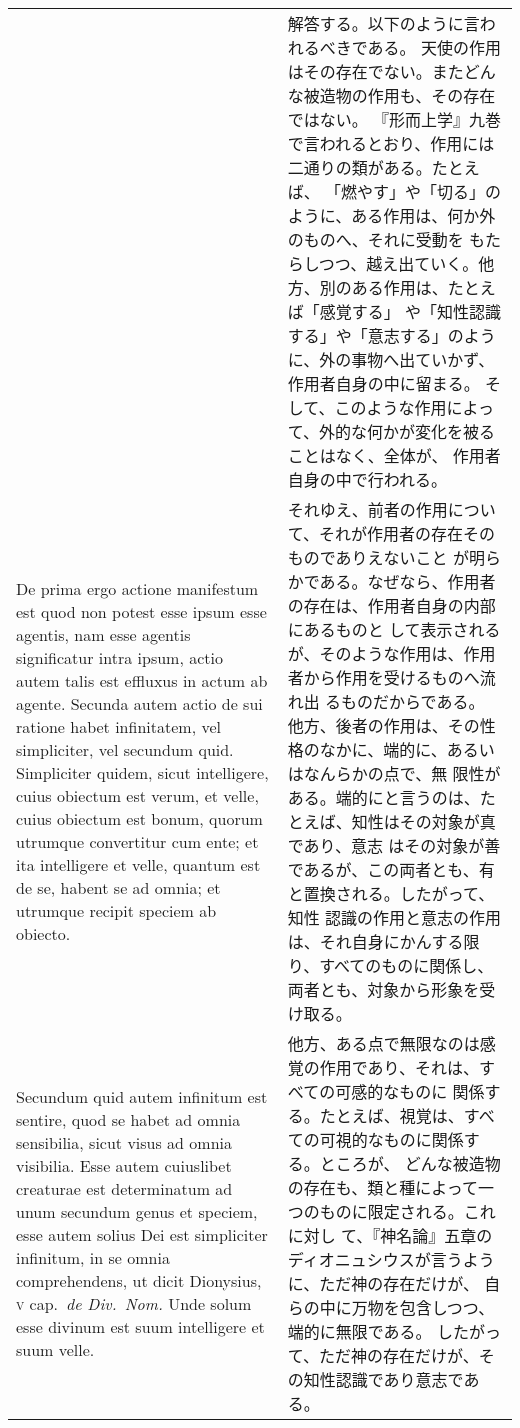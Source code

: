 \documentclass[10pt]{jsarticle} %
\begin{document}
\begin{longtable}{p{21em}p{21em}}
&

解答する。以下のように言われるべきである。
天使の作用はその存在でない。またどんな被造物の作用も、その存在ではない。
『形而上学』九巻で言われるとおり、作用には二通りの類がある。たとえば、
 「燃やす」や「切る」のように、ある作用は、何か外のものへ、それに受動を
 もたらしつつ、越え出ていく。他方、別のある作用は、たとえば「感覚する」
 や「知性認識する」や「意志する」のように、外の事物へ出ていかず、
 作用者自身の中に留まる。
そして、このような作用によって、外的な何かが変化を被ることはなく、全体が、
 作用者自身の中で行われる。


\\

De
prima ergo actione manifestum est quod non potest esse ipsum esse
agentis, nam esse agentis significatur intra ipsum, actio autem talis
est effluxus in actum ab agente. 
Secunda autem actio de sui ratione
habet infinitatem, vel simpliciter, vel secundum quid. Simpliciter
quidem, sicut intelligere, cuius obiectum est verum, et velle, cuius
obiectum est bonum, quorum utrumque convertitur cum ente; et ita
intelligere et velle, quantum est de se, habent se ad omnia; et utrumque
recipit speciem ab obiecto. 

&

それゆえ、前者の作用について、それが作用者の存在そのものでありえないこと
 が明らかである。なぜなら、作用者の存在は、作用者自身の内部にあるものと
 して表示されるが、そのような作用は、作用者から作用を受けるものへ流れ出
 るものだからである。
他方、後者の作用は、その性格のなかに、端的に、あるいはなんらかの点で、無
 限性がある。端的にと言うのは、たとえば、知性はその対象が真であり、意志
 はその対象が善であるが、この両者とも、有と置換される。したがって、知性
 認識の作用と意志の作用は、それ自身にかんする限り、すべてのものに関係し、
 両者とも、対象から形象を受け取る。


\\


Secundum quid autem infinitum est sentire,
quod se habet ad omnia sensibilia, sicut visus ad omnia visibilia. Esse
autem cuiuslibet creaturae est determinatum ad unum secundum genus et
speciem, esse autem solius Dei est simpliciter infinitum, in se omnia
comprehendens, ut dicit Dionysius, {\scshape v} cap.~{\itshape de Div.~Nom.} Unde solum esse
divinum est suum intelligere et suum velle.


&

他方、ある点で無限なのは感覚の作用であり、それは、すべての可感的なものに
 関係する。たとえば、視覚は、すべての可視的なものに関係する。ところが、
 どんな被造物の存在も、類と種によって一つのものに限定される。これに対し
 て、『神名論』五章のディオニュシウスが言うように、ただ神の存在だけが、
 自らの中に万物を包含しつつ、端的に無限である。
したがって、ただ神の存在だけが、その知性認識であり意志である。



\end{longtable}
\end{document}

